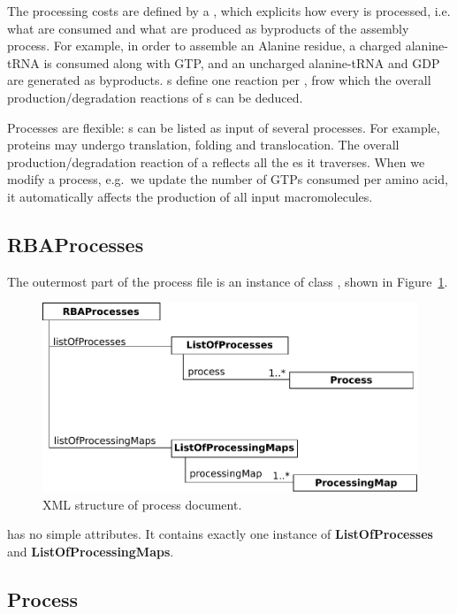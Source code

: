 The processing costs are defined by a \processingmap{},
which explicits how every \component{} is processed, i.e.
what \species{} are consumed and what \species{} are
produced as byproducts of the assembly process.
For example, in order to assemble an Alanine residue,
a charged alanine-tRNA is consumed along with GTP,
and an uncharged alanine-tRNA and GDP are generated as byproducts.
\processingmap{}s define one reaction per \component{}, frow which
the overall production/degradation reactions of \macromolecule{}s can be deduced.

Processes are flexible:
\macromolecule{}s can be listed as input of several processes.
For example, proteins may undergo translation, folding and translocation.
The overall production/degradation reaction of a \macromolecule{} reflects
all the \process{}es it traverses.
When we modify a process,
e.g.\ we update the number of GTPs consumed per amino acid,
it automatically affects the production of all input macromolecules.


\subsection{RBAProcesses}
\label{sec:rba_processes}

The outermost part of the process file is an instance of class
\rbaprocesses, shown in Figure~\ref{fig:processes_doc}.

\begin{figure}
  \centering
  \includegraphics[scale=0.8]{figures/processes_doc}
  \caption{XML structure of process document.}
\label{fig:processes_doc}
\end{figure}

\rbaprocesses{} has no simple attributes.
It contains exactly one instance of \textbf{ListOfProcesses}
and \textbf{ListOfProcessingMaps}.


\subsection{Process}
\label{sec:process}

